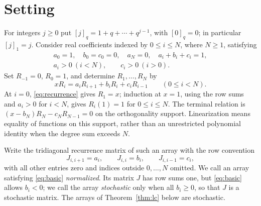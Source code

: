 \section{Setting}\label{sec:criterion}

For integers $j\geq0$ put $[j]_q=1+q+\cdots+q^{j-1}$, with $[0]_q=0$; in particular $[j]_1=j$.
Consider real coefficients indexed by $0\leq i\leq N$, where $N\geq1$, satisfying
\begin{equation}\label{eq:basic}
\begin{gathered}
a_0=1,\quad b_0=c_0=0,\quad a_N=0,\quad a_i+b_i+c_i=1,\\
a_i>0\ (i<N),\qquad c_i>0\ (i>0).
\end{gathered}
\end{equation}
Set $R_{-1}=0$, $R_0=1$, and determine $R_1,\ldots,R_N$ by
\begin{equation}\label{eq:recurrence}
xR_i=a_iR_{i+1}+b_iR_i+c_iR_{i-1}\qquad(0\leq i<N).
\end{equation}
At $i=0$, \eqref{eq:recurrence} gives $R_1=x$; induction at $x=1$, using the row sums and $a_i>0$ for $i<N$, gives $R_i(1)=1$ for $0\leq i\leq N$.
The terminal relation is $(x-b_N)R_N-c_NR_{N-1}=0$ on the orthogonality support. Linearization means equality of functions on this support, rather than an unrestricted polynomial identity when the degree sum exceeds $N$.

Write the tridiagonal recurrence matrix of such an array with the row convention
\[
J_{i,i+1}=a_i,\qquad J_{i,i}=b_i,\qquad J_{i,i-1}=c_i,
\]
with all other entries zero and indices outside $0,\ldots,N$ omitted. We call an array satisfying \eqref{eq:basic} \emph{normalized}. Its matrix $J$ has row sums one, but \eqref{eq:basic} allows $b_i<0$; we call the array \emph{stochastic} only when all $b_i\geq0$, so that $J$ is a stochastic matrix. The arrays of Theorem~\ref{thm:lc} below are stochastic.

